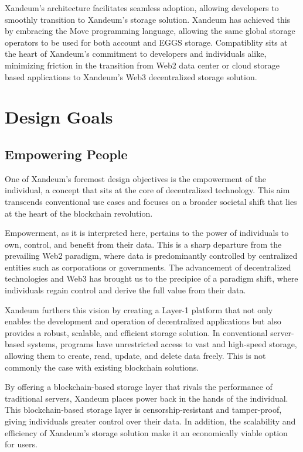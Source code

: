 \documentclass[11pt]{article}   	%
\begin{document}
Xandeum's architecture facilitates seamless adoption, allowing developers to smoothly transition to Xandeum's storage solution. Xandeum has achieved this by embracing the Move programming language, allowing the same global storage operators to be used for both account and EGGS storage. Compatiblity sits at the heart of Xandeum's commitment to developers and individuals alike, minimizing friction in the transition from Web2 data center or cloud storage based applications to Xandeum's Web3 decentralized storage solution.

\clearpage
\tableofcontents
\clearpage

\section{Design Goals}
\subsection{Empowering People}
One of Xandeum's foremost design objectives is the empowerment of the individual, a concept that sits at the core of decentralized technology. This aim transcends conventional use cases and focuses on a broader societal shift that lies at the heart of the blockchain revolution.

Empowerment, as it is interpreted here, pertains to the power of individuals to own, control, and benefit from their data. This is a sharp departure from the prevailing Web2 paradigm, where data is predominantly controlled by centralized entities such as corporations or governments. The advancement of decentralized technologies and Web3 has brought us to the precipice of a paradigm shift, where individuals regain control and derive the full value from their data.

Xandeum furthers this vision by creating a Layer-1 platform that not only enables the development and operation of decentralized applications but also provides a robust, scalable, and efficient storage solution. In conventional server-based systems, programs have unrestricted access to vast and high-speed storage, allowing them to create, read, update, and delete data freely. This is not commonly the case with existing blockchain solutions.

By offering a blockchain-based storage layer that rivals the performance of traditional servers, Xandeum places power back in the hands of the individual. This blockchain-based storage layer is censorship-resistant and tamper-proof, giving individuals greater control over their data. In addition, the scalability and efficiency of Xandeum's storage solution make it an economically viable option for users.
\end{document}
